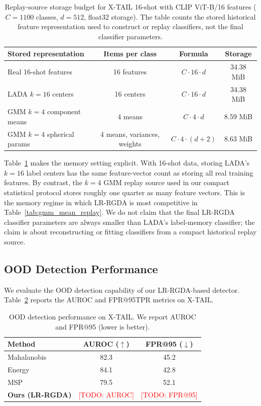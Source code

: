 \documentclass{article}
\newcommand{\todo}[1]{\textcolor{red}{[TODO: #1]}}
\begin{document}
\begin{table}[t]
\centering
\caption{Replay-source storage budget for X-TAIL 16-shot with CLIP ViT-B/16 features ($C=1100$ classes, $d=512$, float32 storage). The table counts the stored historical feature representation used to construct or replay classifiers, not the final classifier parameters.}
\label{tab:storage_budget}
\begin{tabular}{lccc}
\toprule
Stored representation & Items per class & Formula & Storage \\
\midrule
Real 16-shot features & 16 features & $C \cdot 16 \cdot d$ & 34.38 MiB \\
LADA $k{=}16$ centers & 16 centers & $C \cdot 16 \cdot d$ & 34.38 MiB \\
GMM $k{=}4$ component means & 4 means & $C \cdot 4 \cdot d$ & 8.59 MiB \\
GMM $k{=}4$ spherical params & 4 means, variances, weights & $C \cdot 4 \cdot (d+2)$ & 8.63 MiB \\
\bottomrule
\end{tabular}
\end{table}

Table~\ref{tab:storage_budget} makes the memory setting explicit. With 16-shot data, storing LADA's $k=16$ label centers has the same feature-vector count as storing all real training features. By contrast, the $k=4$ GMM replay source used in our compact statistical protocol stores roughly one quarter as many feature vectors. This is the memory regime in which LR-RGDA is most competitive in Table~\ref{tab:gmm_mean_replay}. We do not claim that the final LR-RGDA classifier parameters are always smaller than LADA's label-memory classifier; the claim is about reconstructing or fitting classifiers from a compact historical replay source.

\iffalse
\subsection{OOD Detection Performance}

We evaluate the OOD detection capability of our LR-RGDA-based detector. Table~\ref{tab:ood} reports the AUROC and FPR@95TPR metrics on X-TAIL.

\begin{table}[t]
\centering
\caption{OOD detection performance on X-TAIL. We report AUROC and FPR@95 (lower is better).}
\label{tab:ood}
\begin{tabular}{lcc}
\toprule
Method & AUROC ($\uparrow$) & FPR@95 ($\downarrow$) \\
\midrule
Mahalanobis~\cite{lee2018simple} & 82.3 & 45.2 \\
Energy~\cite{liu2020energy} & 84.1 & 42.8 \\
MSP~\cite{hendrycks2017baseline} & 79.5 & 52.1 \\
\midrule
\textbf{Ours (LR-RGDA)} & \todo{AUROC} & \todo{FPR@95} \\
\bottomrule
\end{tabular}
\end{table}
\end{document}
